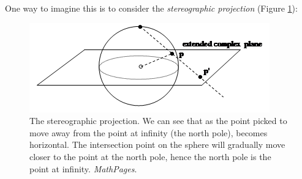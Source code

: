 \documentclass{article}
\theoremstyle{definition}
\begin{document}
One way to imagine this is to consider the \textit{stereographic projection} (Figure \ref{fig:stereographic}):
\begin{figure}[H]
	\centering
	\includegraphics[width=0.5\linewidth]{stereographic_projection}
	\caption{The stereographic projection. We can see that as the point picked to move away from the point at infinity (the north pole), becomes horizontal. The intersection point on the sphere will gradually move closer to the point at the north pole, hence the north pole is the point at infinity. \textit{MathPages}.}
	\label{fig:stereographic}
\end{figure}
\end{document}

